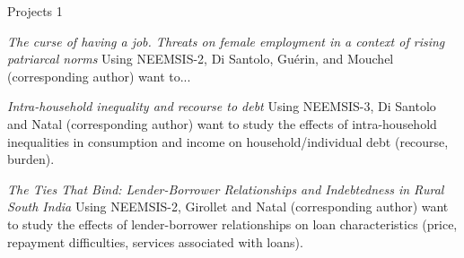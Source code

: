 \documentclass[aspectratio=169]{beamer}
\begin{document}
\begin{frame}{Projects 1}
\begin{scriptsize}

\begin{greenbox}{\textit{The curse of having a job. Threats on female employment in a context of rising patriarcal norms}}
Using NEEMSIS-2, Di Santolo, Guérin, and Mouchel (corresponding author) want to...
\end{greenbox}

\begin{greenbox}{\textit{Intra-household inequality and recourse to debt}}
Using NEEMSIS-3, Di Santolo and Natal (corresponding author) want to study the effects of intra-household inequalities in consumption and income on household/individual debt (recourse, burden).
\end{greenbox}

\begin{greenbox}{\textit{The Ties That Bind: Lender-Borrower Relationships and Indebtedness in Rural South India}}
Using NEEMSIS-2, Girollet and Natal (corresponding author) want to study the effects of lender-borrower relationships on loan characteristics (price, repayment difficulties, services associated with loans).
\end{greenbox}


\end{scriptsize}
\end{frame}
\end{document}
